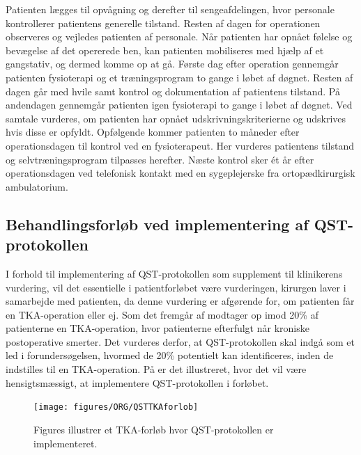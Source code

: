 Patienten lægges til opvågning og derefter til sengeafdelingen, hvor personale kontrollerer patientens generelle tilstand. Resten af dagen for operationen observeres og vejledes patienten af personale. Når patienten har opnået følelse og bevægelse af det opererede ben, kan patienten mobiliseres med hjælp af et gangstativ, og dermed komme op at gå. Første dag efter operation gennemgår patienten fysioterapi og et træningsprogram to gange i løbet af døgnet. Resten af dagen går med hvile samt kontrol og dokumentation af patientens tilstand. På andendagen gennemgår patienten igen fysioterapi to gange i løbet af døgnet. Ved samtale vurderes, om patienten har opnået udskrivningskriterierne og udskrives hvis disse er opfyldt. \citep{pritka2015}
Opfølgende kommer patienten to måneder efter operationsdagen til kontrol ved en fysioterapeut. Her vurderes patientens tilstand og selvtræningsprogram tilpasses herefter. Næste kontrol sker ét år efter operationsdagen ved telefonisk kontakt med en sygeplejerske fra ortopædkirurgisk ambulatorium. \citep{pritka2015}

\subsection{Behandlingsforløb ved implementering af QST-protokollen}
I forhold til implementering af QST-protokollen som supplement til klinikerens vurdering, vil det essentielle i patientforløbet være vurderingen, kirurgen laver i samarbejde med patienten, da denne vurdering er afgørende for, om patienten får en TKA-operation eller ej. Som det fremgår af  modtager op imod 20\% af patienterne en TKA-operation, hvor patienterne efterfulgt når kroniske postoperative smerter. Det vurderes derfor, at QST-protokollen skal indgå som et led i forundersøgelsen, hvormed de 20\% potentielt kan identificeres, inden de indstilles til en TKA-operation. På  er det illustreret, hvor det vil være hensigtsmæssigt, at implementere QST-protokollen i forløbet. 

\begin{figure}[H]
\begin{center}
	\texttt{[image: figures/ORG/QSTTKAforlob]}
\end{center}
	\caption{Figures illustrer et TKA-forløb hvor QST-protokollen er implementeret.}
	\label{fig:QSTKAforlob}
\end{figure}

